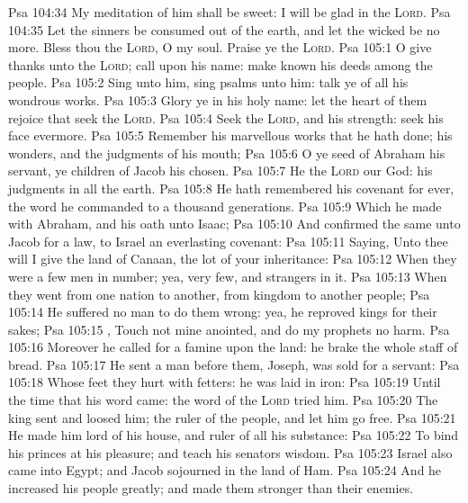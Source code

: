 \vs Psa 104:34 My meditation of him shall be sweet: I will be glad in the \textsc{Lord}.
\vs Psa 104:35 Let the sinners be consumed out of the earth, and let the wicked be no more. Bless thou the \textsc{Lord}, O my soul. Praise ye the \textsc{Lord}.
\vs Psa 105:1 O give thanks unto the \textsc{Lord}; call upon his name: make known his deeds among the people.
\vs Psa 105:2 Sing unto him, sing psalms unto him: talk ye of all his wondrous works.
\vs Psa 105:3 Glory ye in his holy name: let the heart of them rejoice that seek the \textsc{Lord}.
\vs Psa 105:4 Seek the \textsc{Lord}, and his strength: seek his face evermore.
\vs Psa 105:5 Remember his marvellous works that he hath done; his wonders, and the judgments of his mouth;
\vs Psa 105:6 O ye seed of Abraham his servant, ye children of Jacob his chosen.
\vs Psa 105:7 He  the \textsc{Lord} our God: his judgments  in all the earth.
\vs Psa 105:8 He hath remembered his covenant for ever, the word  he commanded to a thousand generations.
\vs Psa 105:9 Which  he made with Abraham, and his oath unto Isaac;
\vs Psa 105:10 And confirmed the same unto Jacob for a law,  to Israel  an everlasting covenant:
\vs Psa 105:11 Saying, Unto thee will I give the land of Canaan, the lot of your inheritance:
\vs Psa 105:12 When they were  a few men in number; yea, very few, and strangers in it.
\vs Psa 105:13 When they went from one nation to another, from  kingdom to another people;
\vs Psa 105:14 He suffered no man to do them wrong: yea, he reproved kings for their sakes;
\vs Psa 105:15 , Touch not mine anointed, and do my prophets no harm.
\vs Psa 105:16 Moreover he called for a famine upon the land: he brake the whole staff of bread.
\vs Psa 105:17 He sent a man before them,  Joseph,  was sold for a servant:
\vs Psa 105:18 Whose feet they hurt with fetters: he was laid in iron:
\vs Psa 105:19 Until the time that his word came: the word of the \textsc{Lord} tried him.
\vs Psa 105:20 The king sent and loosed him;  the ruler of the people, and let him go free.
\vs Psa 105:21 He made him lord of his house, and ruler of all his substance:
\vs Psa 105:22 To bind his princes at his pleasure; and teach his senators wisdom.
\vs Psa 105:23 Israel also came into Egypt; and Jacob sojourned in the land of Ham.
\vs Psa 105:24 And he increased his people greatly; and made them stronger than their enemies.
